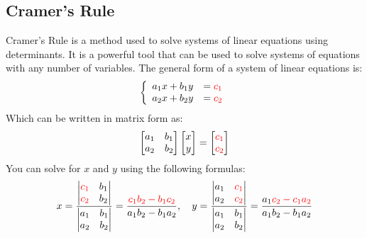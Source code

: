 \documentclass{article}
\theoremstyle{mytheoremstyle}
\theoremstyle{mytheoremstyle}
\theoremstyle{myproblemstyle}
\theoremstyle{break}
\begin{document}
\subsection{Cramer's Rule}
\label{subsec:Cramers_Rule}
Cramer's Rule is a method used to solve systems of linear equations using determinants. It is a powerful tool that can be used to solve systems of equations with any number of variables. The general form of a system of linear equations is:
		\begin{equation}
			\left.\left\{\begin{array}{ll}a_1x+b_1y&=\color{red}{c_1}\\a_2x+b_2y&=\color{red}{c_2}\end{array}\right.\right.
		\end{equation}
		Which can be written in matrix form as:
		\begin{equation}
			\begin{bmatrix}a_1&b_1\\a_2&b_2\end{bmatrix}\begin{bmatrix}x\\y\end{bmatrix}=\begin{bmatrix}\color{red}{c_1}\\\color{red}{c_2}\end{bmatrix}
		\end{equation}
		You can solve for $x$ and $y$ using the following formulas:
		\begin{equation}
			x=\frac{\begin{vmatrix}\color{red}{c_1}&b_1\\\color{red}{c_2}&b_2\end{vmatrix}}{\begin{vmatrix}a_1&b_1\\a_2&b_2\end{vmatrix}}=\frac{\color{red}{c_1}b_2-b_1\color{red}{c_2}}{a_1b_2-b_1a_2},\quad y=\frac{\begin{vmatrix}a_1&\color{red}{c_1}\\a_2&\color{red}{c_2}\end{vmatrix}}{\begin{vmatrix}a_1&b_1\\a_2&b_2\end{vmatrix}}=\frac{a_1\color{red}{c_2}-\color{red}{c_1}a_2}{a_1b_2-b_1a_2}
		\end{equation}
\end{document}
